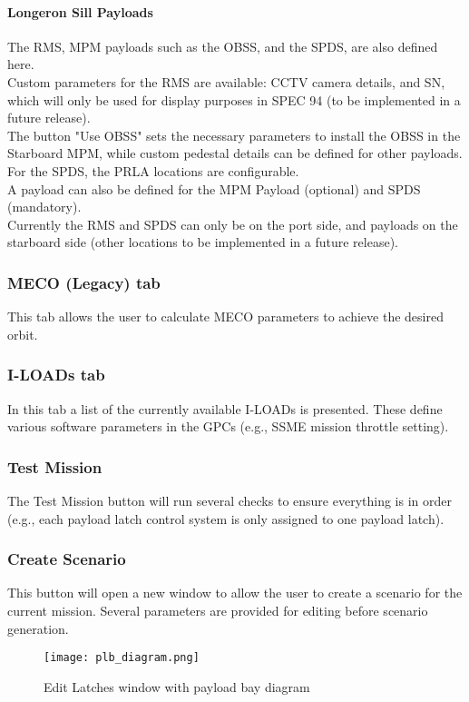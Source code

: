 \documentclass[Space_Shuttle_Vessel_Manual.tex]{subfiles}
\begin{document}
\begin{multicols*}{2}
\paragraph{Longeron Sill Payloads}
The RMS, MPM payloads such as the OBSS, and the SPDS, are also defined here.\\
Custom parameters for the RMS are available: CCTV camera details, and SN, which will only be used for display purposes in SPEC 94 (to be implemented in a future release).\\
The button "Use OBSS" sets the necessary parameters to install the OBSS in the Starboard MPM, while custom pedestal details can be defined for other payloads.\\
For the SPDS, the PRLA locations are configurable.\\
A payload can also be defined for the MPM Payload (optional) and SPDS (mandatory).\\
Currently the RMS and SPDS can only be on the port side, and payloads on the starboard side (other locations to be implemented in a future release).\\

\subsubsection{MECO (Legacy) tab}
\label{sec:meco-legacy}
This tab allows the user to calculate MECO parameters to achieve the desired orbit.\\


\subsubsection{I-LOADs tab}
In this tab a list of the currently available I-LOADs is presented. These define various software parameters in the GPCs (e.g., SSME mission throttle setting).


\subsubsection{Test Mission}
The Test Mission button will run several checks to ensure everything is in order (e.g., each payload latch control system is only assigned to one payload latch).


\subsubsection{Create Scenario}
This button will open a new window to allow the user to create a scenario for the current mission. Several parameters are provided for editing before scenario generation.


\end{multicols*}

\begin{figure}[H]
	\centering
	\captionsetup{justification=centering}
  \texttt{[image: plb\_diagram.png]}
  \caption{Edit Latches window with payload bay diagram}
  \label{fig:plb_diagram}
\end{figure}
\end{document}
